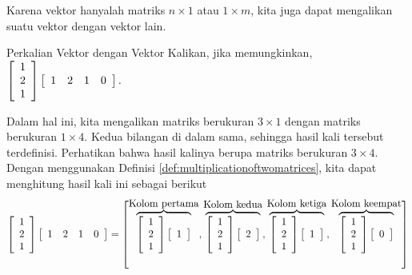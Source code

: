 Karena vektor hanyalah matriks $ n \times 1$ atau $1 \times m$,
kita juga dapat mengalikan suatu vektor dengan vektor lain. 

\begin{example}{Perkalian Vektor dengan Vektor}\label{exa:vectormultiplication}
Kalikan, jika memungkinkan, $\left[
\begin{array}{r}
1 \\
2 \\
1
\end{array}
\right] \left[
\begin{array}{rrrr}
1 & 2 & 1 & 0
\end{array}
\right] .$ 
\end{example}

\begin{solution} Dalam hal ini, kita mengalikan matriks berukuran $3 \times 1$ dengan matriks berukuran $1 \times
4.$ Kedua bilangan di dalam sama, sehingga hasil kali tersebut terdefinisi. Perhatikan bahwa hasil kalinya berupa matriks berukuran $3 \times 4$.
Dengan menggunakan Definisi \ref{def:multiplicationoftwomatrices}, kita dapat menghitung hasil kali ini sebagai berikut $\:$
\begin{equation*}
\left[
\begin{array}{r}
1 \\
2 \\
1
\end{array}
\right] \left[
\begin{array}{rrrr}
1 & 2 & 1 & 0
\end{array}
\right] = 
\left[ \overset{
\mbox{Kolom pertama}}{\overbrace{\left[
\begin{array}{r}
1 \\
2 \\
1
\end{array}
\right] \left[
\begin{array}{r}
1
\end{array}
\right] }},\overset{\mbox{Kolom kedua}}{\overbrace{\left[
\begin{array}{r}
1 \\
2\\
1
\end{array}
\right] \left[
\begin{array}{r}
2 
\end{array}
\right] }},\overset{\mbox{Kolom ketiga}}{\overbrace{\left[
\begin{array}{r}
1 \\
2 \\
1
\end{array}
\right] \left[
\begin{array}{r}
1
\end{array}
\right] }}, \overset {\mbox{Kolom keempat}}{\overbrace{\left[
\begin{array}{r}
1\\
2\\
1
\end{array}
\right] \left[
\begin{array}{r}
0
\end{array}
\right]}}
\right]
\end{equation*}


\end{solution}
